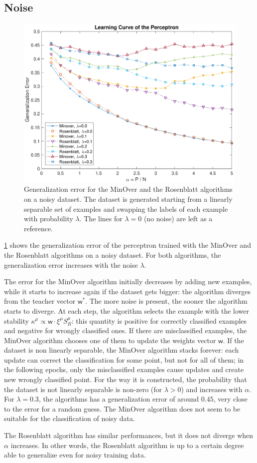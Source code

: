 \subsection{Noise}
\begin{figure}[t]
	\centering
	\includegraphics[width=\columnwidth]{figures/noise}
    \caption{Generalization error for the MinOver and the Rosenblatt algorithms on a noisy dataset. The dataset is generated starting from a linearly separable set of examples and swapping the labels of each example with probability $\lambda$. The lines for $\lambda = 0$ (no noise) are left as a reference.}
	\label{fig:noise}
\end{figure}

\cref{fig:noise} shows the generalization error of the perceptron trained with the MinOver and the Rosenblatt algorithms on a noisy dataset.
For both algorithms, the generalization error increases with the noise $\lambda$.

The error for the MinOver algorithm initially decreases by adding new examples, while it starts to increase again if the dataset gets bigger:
the algorithm diverges from the teacher vector $\bm{\mathsf{w}}^{*}$.
The more noise is present, the sooner the algorithm starts to diverge.
At each step, the algorithm selects the example with the lower stability $\kappa^\mu \propto \bm{\mathsf{w}} \cdotp \xi^\mu S^\mu_R$:
this quantity is positive for correctly classified examples and negative for wrongly classified ones.
If there are misclassified examples, the MinOver algorithm chooses one of them to update the weights vector $\bm{\mathsf{w}}$.
If the dataset is non linearly separable, the MinOver algorithm stacks forever:
each update can correct the classification for some point, but not for all of them;
in the following epochs, only the misclassified examples cause updates and create new wrongly classified point.
For the way it is constructed, the probability that the dataset is not linearly separable is non-zero (for $\lambda > 0$) and increases with $\alpha$.
For $\lambda = 0.3$, the algorithms has a generalization error of around $0.45$, very close to the error for a random guess.
The MinOver algorithm does not seem to be suitable for the classification of noisy data.

The Rosenblatt algorithm has similar performances, but it does not diverge when $\alpha$ increases.
In other words, the Rosenblatt algorithm is up to a certain degree able to generalize even for noisy training data.
